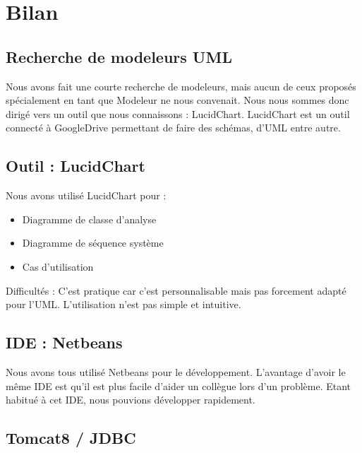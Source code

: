 \documentclass[a4paper,oneside,10pt]{article}
\begin{document}
\pagebreak

\section{Bilan}


\subsection{Recherche de modeleurs UML}

Nous avons fait une courte recherche de modeleurs, mais aucun de ceux proposés spécialement en tant que Modeleur ne nous convenait. Nous nous sommes donc dirigé vers un outil que nous connaissons : LucidChart. LucidChart est un outil connecté à GoogleDrive permettant de faire des schémas, d'UML entre autre. 


\subsection{Outil : LucidChart}

Nous avons utilisé LucidChart pour : 
\begin{itemize}
	\item Diagramme de classe d'analyse
	\item Diagramme de séquence système
	\item Cas d'utilisation
\end{itemize}

Difficultés : C'est pratique car c'est personnalisable mais pas forcement adapté pour l'UML. L'utilisation n'est pas simple et intuitive. 

\subsection{IDE : Netbeans}

Nous avons tous utilisé Netbeans pour le développement. L'avantage d'avoir le même IDE est qu'il est plus facile d'aider un collègue lors d'un problème. Etant habitué à cet IDE, nous pouvions développer rapidement. 

\subsection{Tomcat8 / JDBC}
\end{document}
